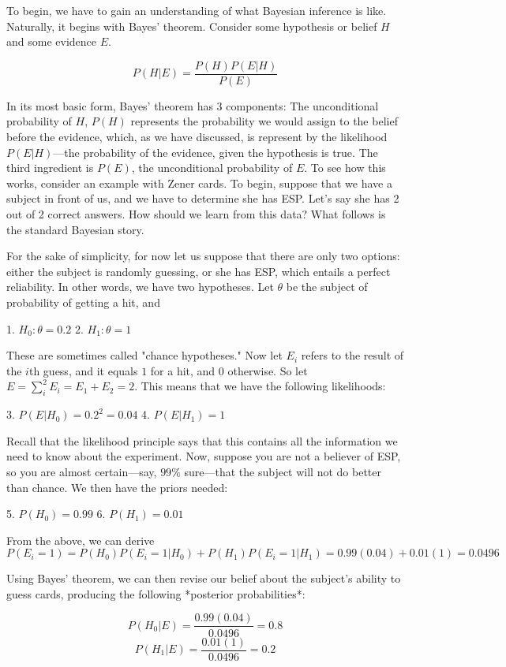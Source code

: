 To begin, we have to gain an understanding of what Bayesian inference is
like. Naturally, it begins with Bayes' theorem. Consider some hypothesis
or belief \(H\) and some evidence \(E\).

\[P(H|E) = \frac{P(H)P(E|H)}{P(E)}\]

In its most basic form, Bayes' theorem has 3 components: The
unconditional probability of \(H\), \(P(H)\) represents the probability
we would assign to the belief before the evidence, which, as we have
discussed, is represent by the likelihood \(P(E|H)\)---the probability
of the evidence, given the hypothesis is true. The third ingredient is
\(P(E)\), the unconditional probability of \(E\). To see how this works,
consider an example with Zener cards. To begin, suppose that we have a
subject in front of us, and we have to determine she has ESP. Let's say
she has 2 out of 2 correct answers. How should we learn from this data?
What follows is the standard Bayesian story.

For the sake of simplicity, for now let us suppose that there are only
two options: either the subject is randomly guessing, or she has ESP,
which entails a perfect reliability. In other words, we have two
hypotheses. Let \(\theta\) be the subject of probability of getting a
hit, and

1. \(H_0: \theta = 0.2\) 2. \(H_1: \theta = 1\)

These are sometimes called "chance hypotheses." Now let \(E_i\) refers
to the result of the \(i\)th guess, and it equals \(1\) for a hit, and
\(0\) otherwise. So let \(E = \sum_i^2 E_i =  E_1 + E_2 = 2\). This
means that we have the following likelihoods:

3. \(P(E|H_0) = 0.2^2=0.04\) 4. \(P(E|H_1) = 1\)

Recall that the likelihood principle says that this contains all the
information we need to know about the experiment. Now, suppose you are
not a believer of ESP, so you are almost certain---say, \(99\%\)
sure---that the subject will not do better than chance. We then have the
priors needed:

5. \(P(H_0) = 0.99\) 6. \(P(H_1) = 0.01\)

From the above, we can derive
\[P(E_i = 1) = P(H_0)P(E_i=1|H_0) + P(H_1)P(E_i=1|H_1) = 0.99(0.04)+0.01(1) = 0.0496\]

Using Bayes' theorem, we can then revise our belief about the subject's
ability to guess cards, producing the following *posterior
probabilities*:

\[P(H_0|E) = \frac{0.99(0.04)}{0.0496} = 0.8\]
\[P(H_1|E) = \frac{0.01(1)}{0.0496} = 0.2\]

